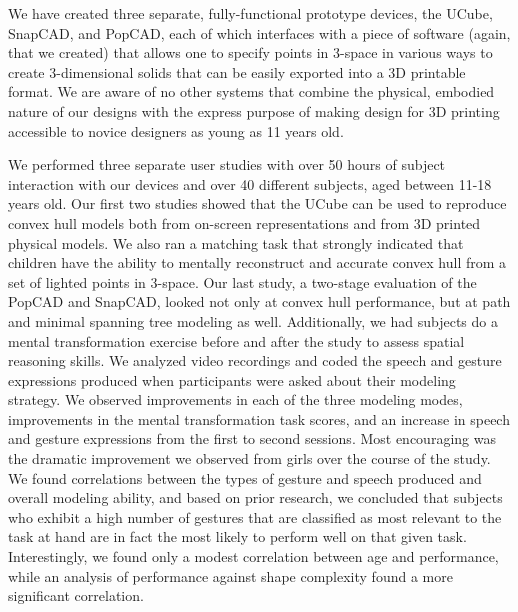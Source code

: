 We have created three separate, fully-functional prototype devices, the UCube,
SnapCAD, and PopCAD, each of which interfaces with a piece of software (again,
that we created) that allows one to specify points in 3-space in various ways to
create 3-dimensional solids that can be easily exported into a 3D printable
format. We are aware of no other systems that combine the physical, embodied
nature of our designs with the express purpose of making design for 3D printing
accessible to novice designers as young as 11 years old.

We performed three separate user studies with over 50 hours of subject
interaction with our devices and over 40 different subjects, aged between 11-18
years old. Our first two studies showed that the UCube can be used to reproduce
convex hull models both from on-screen representations and from 3D printed
physical models. We also ran a matching task that strongly indicated that
children have the ability to mentally reconstruct and accurate convex hull from
a set of lighted points in 3-space. Our last study, a two-stage evaluation of
the PopCAD and SnapCAD, looked not only at convex hull performance, but at path
and minimal spanning tree modeling as well. Additionally, we had subjects do a
mental transformation exercise before and after the study to assess spatial
reasoning skills. We analyzed video recordings and coded the speech and gesture
expressions produced when participants were asked about their modeling strategy.
We observed improvements in each of the three modeling modes, improvements in
the mental transformation task scores, and an increase in speech and gesture
expressions from the first to second sessions. Most encouraging was the dramatic
improvement we observed from girls over the course of the study. We found
correlations between the types of gesture and speech produced and overall
modeling ability, and based on prior research, we concluded that subjects who
exhibit a high number of gestures that are classified as most relevant to the
task at hand are in fact the most likely to perform well on that given task.
Interestingly, we found only a modest correlation between age and performance,
while an analysis of performance against shape complexity found a more
significant correlation.

